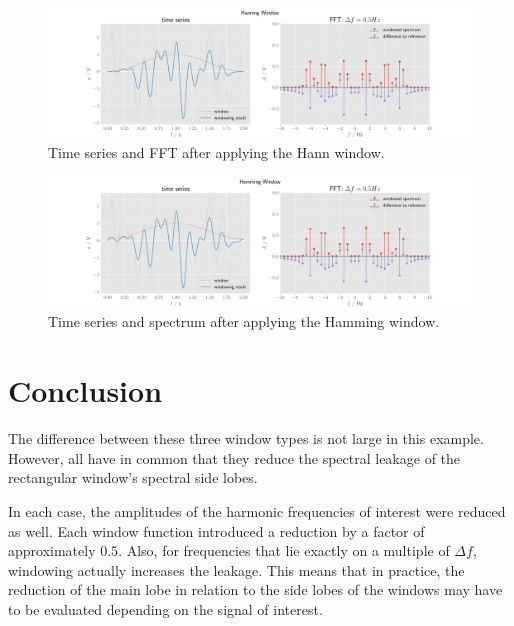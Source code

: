 \documentclass[10pt, a4paper]{article}
\begin{document}
\begin{figure}[H]
  \centering
  \includegraphics[width=\textwidth]{graphics/Hanning.pdf}
  \caption{Time series and FFT after applying the Hann window.}\label{fig:win_hann}
\end{figure}

\begin{figure}[H]
  \centering
  \includegraphics[width=\textwidth]{graphics/Hamming.pdf}
  \caption{Time series and spectrum after applying the Hamming window.}\label{fig:win_hamm}
\end{figure}


\section{Conclusion}
The difference between these three window types is not large in this example. However, all have in common that they reduce the spectral leakage of the rectangular window's spectral side lobes. %

In each case, the amplitudes of the harmonic frequencies of interest were reduced as well. Each window function introduced a reduction by a factor of approximately $0.5$. Also, for frequencies that lie exactly on a multiple of $\Delta f$, windowing actually increases the leakage.
This means that in practice, the reduction of the main lobe in relation to the side lobes of the windows may have to be evaluated depending on the signal of interest.
\end{document}
